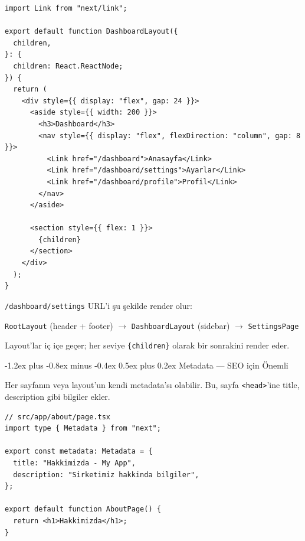 \documentclass[12pt, a4paper]{article}
\makeatletter
\renewcommand{\subsection}{%
  \@startsection{subsection}{2}{\z@}%
    {-1.2ex plus -0.8ex minus -0.4ex}%
    {0.5ex plus 0.2ex}%
    {\normalfont\large\bfseries\sffamily\color{secondary}}%
}
\makeatother
\begin{document}
\begin{tcolorbox}[enhanced, colback=codebg, colframe=gray!30,
    colbacktitle=primary!85!black, coltitle=white, arc=4pt,
    title={\sffamily\bfseries\small src/app/dashboard/layout.tsx}]
\begin{lstlisting}[style=jsxstyle]
import Link from "next/link";

export default function DashboardLayout({
  children,
}: {
  children: React.ReactNode;
}) {
  return (
    <div style={{ display: "flex", gap: 24 }}>
      <aside style={{ width: 200 }}>
        <h3>Dashboard</h3>
        <nav style={{ display: "flex", flexDirection: "column", gap: 8 }}>
          <Link href="/dashboard">Anasayfa</Link>
          <Link href="/dashboard/settings">Ayarlar</Link>
          <Link href="/dashboard/profile">Profil</Link>
        </nav>
      </aside>

      <section style={{ flex: 1 }}>
        {children}
      </section>
    </div>
  );
}
\end{lstlisting}
\end{tcolorbox}

\vspace{6pt}

\begin{infobox}
\texttt{/dashboard/settings} URL'i şu şekilde render olur:

\vspace{4pt}
\texttt{RootLayout} (header + footer) $\rightarrow$
\texttt{DashboardLayout} (sidebar) $\rightarrow$
\texttt{SettingsPage}

\vspace{4pt}
Layout'lar iç içe geçer; her seviye \texttt{\{children\}} olarak bir
sonrakini render eder.
\end{infobox}

\subsection{Metadata --- SEO için Önemli}

Her sayfanın veya layout'un kendi metadata'sı olabilir. Bu, sayfa
\texttt{<head>}'ine title, description gibi bilgiler ekler.

\vspace{6pt}

\begin{tcolorbox}[enhanced, colback=codebg, colframe=gray!30,
    colbacktitle=accent!85!black, coltitle=white, arc=4pt,
    title={\sffamily\bfseries\small Statik Metadata}]
\begin{lstlisting}[style=jsxstyle]
// src/app/about/page.tsx
import type { Metadata } from "next";

export const metadata: Metadata = {
  title: "Hakkimizda - My App",
  description: "Sirketimiz hakkinda bilgiler",
};

export default function AboutPage() {
  return <h1>Hakkimizda</h1>;
}
\end{lstlisting}
\end{tcolorbox}
\end{document}
